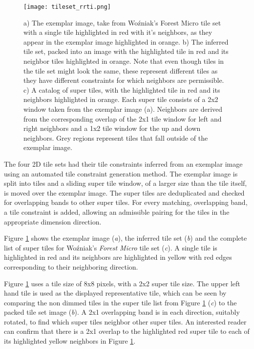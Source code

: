 \begin{figure}[h]
  \texttt{[image: tileset\_rrti.png]}
  \caption{a) The exemplar image, take from Wo\'zniak's Forest Micro tile set with a single tile highlighted in red with it's neighbors, as they appear in
           the exemplar image highlighted in orange.
           b) The inferred tile set, packed into an image with the highlighted tile in red and its neighbor tiles highlighted in orange. Note that even though
           tiles in the tile set might look the same, these represent different tiles as they have different constraints for which neighbors are permissible.
           c) A catalog of super tiles, with the highlighted tile in red and its neighbors highlighted in orange. Each super tile consists of a 2x2 window
           taken from the exemplar image (a). Neighbors are derived from the corresponding overlap of the 2x1 tile window  for left and right neighbors and
           a 1x2 tile window for the up and down neighbors. Grey regions represent tiles that fall outside of the exemplar image. }
  \label{fig:rrti_tileset}
\end{figure}

The four 2D tile sets had their tile constraints inferred from an exemplar image using
an automated tile constraint generation method.
The exemplar image is split into tiles and a sliding super tile window, of a larger size than the tile itself, is moved over the exemplar image.
The super tiles are deduplicated and checked for overlapping bands to other super tiles.
For every matching, overlapping band, a tile constraint is added, allowing an admissible pairing for the tiles in the
appropriate dimension direction.

Figure \ref{fig:rrti_tileset} shows the exemplar image (\textit{a}), the inferred tile set (\textit{b}) and the complete list of super tiles
for Wo\'zniak's \textit{Forest Micro} tile set (\textit{c}).
A single tile is highlighted in red and its neighbors are highlighted in yellow with red edges corresponding to their neighboring direction.

Figure \ref{fig:rrti_tileset} uses a tile size of 8x8 pixels, with a 2x2 super tile size.
The upper left hand tile is used as the displayed representative tile, which can be seen by comparing the non dimmed tiles in the
super tile list from Figure \ref{fig:rrti_tileset} (\textit{c}) to the packed tile set image (\textit{b}).
A 2x1 overlapping band is in each direction, suitably rotated, to find which super tiles neighbor other super tiles.
An interested reader can confirm that there is a 2x1 overlap to the highlighted red super tile to each of its highlighted yellow neighbors
in Figure \ref{fig:rrti_tileset}.


